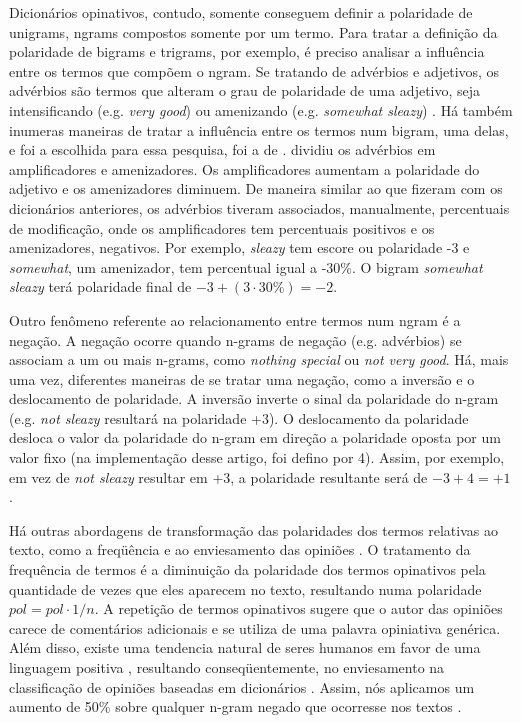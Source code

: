 \documentclass[template.tex]{subfiles}
\begin{document}
Dicionários opinativos, contudo, somente conseguem definir a polaridade de unigrams, ngrams compostos somente por um termo. Para tratar a definição da polaridade de bigrams e trigrams, por exemplo, é preciso analisar a influência entre os termos que compõem o ngram. Se tratando de advérbios e adjetivos, os advérbios são termos que alteram o grau de polaridade de uma adjetivo, seja intensificando (e.g. \textit{very good}) ou amenizando (e.g. \textit{somewhat sleazy}) \cite{quirk1985comprehensive}. Há também inumeras maneiras de tratar a influência entre os termos num bigram, uma delas, e foi a escolhida para essa pesquisa, foi a de .  dividiu os advérbios em amplificadores e amenizadores. Os amplificadores aumentam a polaridade do adjetivo e os amenizadores diminuem. De maneira similar ao que fizeram com os dicionários anteriores, os advérbios tiveram associados, manualmente, percentuais de modificação, onde os amplificadores tem percentuais positivos e os amenizadores, negativos. Por exemplo, \textit{sleazy} tem escore ou polaridade -3 e \textit{somewhat}, um amenizador, tem percentual igual a -30\%. O bigram \textit{somewhat sleazy} terá polaridade final de $-3 + (3 \cdot 30\%) = -2$.

Outro fenômeno referente ao relacionamento entre termos num ngram é a negação. A negação ocorre quando n-grams de negação (e.g. advérbios) se associam a um ou mais n-grams, como \textit{nothing special} ou \textit{not very good}. Há, mais uma vez, diferentes maneiras de se tratar uma negação, como a inversão e o deslocamento de polaridade. A inversão inverte o sinal da polaridade do n-gram (e.g. \textit{not sleazy} resultará na polaridade +3). O deslocamento da polaridade desloca o valor da polaridade do n-gram em direção a polaridade oposta por um valor fixo (na implementação desse artigo, foi defino por 4). Assim, por exemplo, em vez de \textit{not sleazy} resultar em +3, a polaridade resultante será de $-3 + 4 = +1$ \cite{taboada2008extracting}.

Há outras abordagens de transformação das polaridades dos termos relativas ao texto, como a freqüência e ao enviesamento das opiniões \cite{taboada2011lexicon}. O tratamento da frequência de termos é a diminuição da polaridade dos termos opinativos pela quantidade de vezes que eles aparecem no texto, resultando numa polaridade $pol = pol \cdot 1/n$. A repetição de termos opinativos sugere que o autor das opiniões carece de comentários adicionais e se utiliza de uma palavra opiniativa genérica. Além disso, existe uma tendencia natural de seres humanos em favor de uma linguagem positiva \cite{boucher1969pollyanna}, resultando conseqüentemente, no enviesamento na classificação de opiniões baseadas em dicionários \cite{kennedy2006sentiment}. Assim, nós aplicamos um aumento de 50\% sobre qualquer n-gram negado que ocorresse nos textos \cite{taboada2011lexicon}.
\end{document}
